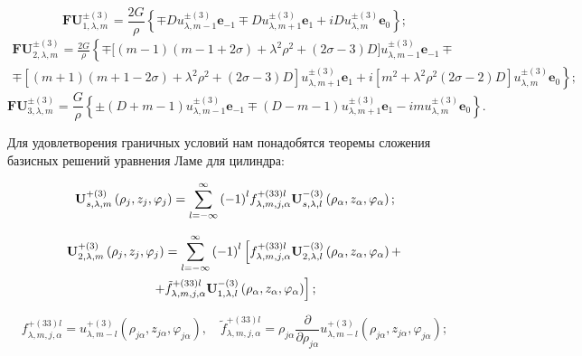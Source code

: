 \begin{equation}
\mathbf{FU}_{1,\lambda,m}^{\pm(3)}=\frac{2G}{\rho}\left\{\mp Du_{\lambda,m-1}^{\pm(3)}\mathbf{e}_{-1}\mp Du_{\lambda,m+1}^{\pm(3)}\mathbf{e}_1+iDu_{\lambda,m}^{\pm(3)}\mathbf{e}_0\right\};
\end{equation}
\begin{multline}
\mathbf{FU}_{2,\lambda,m}^{\pm(3)}=\frac{2G}{\rho}\left\{\mp\Big[(m-1)(m-1+2\sigma)+\lambda^2\rho^2+(2\sigma-3)D\Big]u_{\lambda,m-1}^{\pm(3)}\mathbf{e}_{-1}\mp\right.\\
\mp[(m+1)(m+1-2\sigma)+\lambda^2\rho^2+(2\sigma-3)D]u_{\lambda,m+1}^{\pm(3)}\mathbf{e}_1+\left.i[m^2+\lambda^2\rho^2(2\sigma-2)D]u_{\lambda,m}^{\pm(3)}\mathbf{e}_0\right\};
\end{multline}
\begin{equation}
\mathbf{FU}_{3,\lambda,m}^{\pm(3)}=\frac{G}{\rho}\left\{\pm(D+m-1)u_{\lambda,m-1}^{\pm(3)}\mathbf{e}_{-1}\mp\right.\left.(D-m-1)u_{\lambda,m+1}^{\pm(3)}\mathbf{e}_1-imu_{\lambda,m}^{\pm(3)}\mathbf{e}_0\right\}.
\end{equation}

Для удовлетворения граничных условий нам понадобятся теоремы сложения базисных решений уравнения Ламе для цилиндра:

\begin{equation}
{\bf{U}}_{s,\lambda ,m}^{ + (3)}\left( {{\rho _j},{z_j},{\varphi _j}} \right) = \sum\limits_{l =  - \infty }^\infty  {{{( - 1)}^l}} f_{\lambda ,m,j,\alpha }^{ + (33)l}{\bf{U}}_{s,\lambda ,l}^{ - (3)}\left( {{\rho _\alpha },{z_\alpha },{\varphi _\alpha }} \right);
\label{eq:7:7}
\end{equation}

\begin{multline}
{\bf{U}}_{2,\lambda ,m}^{ + (3)}\left( {{\rho _j},{z_j},{\varphi _j}} \right) = \sum\limits_{l =  - \infty }^\infty  {{{( - 1)}^l}} \left[ {f_{\lambda ,m,j,\alpha }^{ + (33)l}{\bf{U}}_{2,\lambda ,l}^{ - (3)}\left( {{\rho _\alpha },{z_\alpha },{\varphi _\alpha }} \right) + } \right.\\
\left. { + \tilde f_{\lambda ,m,j,\alpha }^{ + (33)l}{\bf{U}}_{1,\lambda ,l}^{ - (3)}\left( {{\rho _\alpha },{z_\alpha },{\varphi _\alpha }} \right)} \right];
\label{eq:7:8}
\end{multline}

$$
f_{\lambda ,m,j,\alpha }^{ + (33)l} = u_{\lambda ,m - l}^{ + (3)}\left( {{\rho _{j\alpha }},{z_{j\alpha }},{\varphi _{j\alpha }}} \right),\quad
\tilde f_{\lambda ,m,j,\alpha }^{ + (33)l} = {\rho _{j\alpha }}\frac{\partial }{{\partial {\rho _{j\alpha }}}}u_{\lambda ,m - l}^{ + (3)}\left( {{\rho _{j\alpha }},{z_{j\alpha }},{\varphi _{j\alpha }}} \right);
$$

